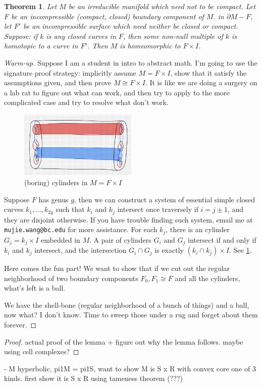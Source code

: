 \documentclass[12pt]{amsart}
\newtheorem{sat}{Theorem}[section]		\newtheorem{lem}[sat]{Lemma}
\theoremstyle{remark}
\begin{document}
\begin{sat}
	Let \(M\) be an irreducible manifold which need not to be compact. Let \(F\) be an incompressible (compact, closed) boundary component of \(M\). in \(\partial M - F\), let \(F'\) be an incompressible surface which need neither be closed or compact. Suppose: if \(k\) is any closed curves in \(F\), then some non-null multiple of \(k\) is homotopic to a curve in \(F'\). Then \(M\) is homeomorphic to \(F\times I\).
\end{sat}


\begin{proof}[Warm-up]
	 Suppose I am a student in intro to abstract math. I'm going to use the signature proof strategy: implicitly assume \(M = F \times I\), show that it satisfy the assumptions given, and then prove \(M \cong F \times I\). It is like we are doing a surgery on a lab rat to figure out what can work, and then try to apply to the more complicated case and try to resolve what don't work.
	 \begin{figure}[h!]
		\centering
		\includegraphics[width = 0.5\textwidth]{IMG_0627.jpg}
	 	\caption{(boring) cylinders in \(M = F\times I\)}
	 	\label{fig:cylinders}
	 \end{figure}

	 Suppose \(F\) has genus \(g\), then we can construct a system of essential simple closed curves \(k_1, \ldots, k_{2g}\) such that \(k_i\) and \(k_j\) intersect once traversely if \(i = j \pm 1\), and they are disjoint otherwise. If you have trouble finding such system, email me at \texttt{mujie.wang@bc.edu} for more assistance. For each \(k_j\), there is an cylinder \(G_j = k_j \times I\) embedded in \(M\). A pair of cylinders \(G_i\) and \(G_j\) intersect if and only if \(k_i\) and \(k_j\) intersect, and the intersection \(G_i \cap G_j\) is exactly \((k_i \cap k_j)\times I\). See \ref{fig:cylinders}.

	 Here comes the fun part! We want to show that if we cut out the regular neighborhood of two boundary components \(F_0, F_1 \cong F\) and all the cylinders, what's left is a ball. 


	 We have the shell-bone (regular neighborhood of a bunch of things) and a ball, now what? I don't know. Time to sweep those under a rug and forget about them forever.
\end{proof}

\begin{proof}
	actual proof of the lemma + figure out why the lemma follows. maybe using cell complexes?
\end{proof}

- M hyperbolic, pi1M = pi1S, want to show M is S x R with convex core one of 3 kinds. first show it is S x R using tameness theorem (???) 
\end{document}

